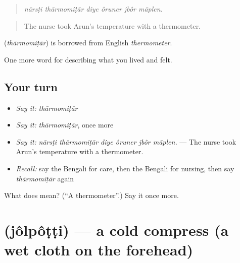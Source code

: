 \begin{quote}
     
\end{quote}

\begin{quote}
\emph{nārsṭi thārmomiṭār diye ôruner jbôr māplen.}
\end{quote}

\begin{quote}
The nurse took Arun's temperature with a thermometer.
\end{quote}

\begin{cousinweb}
\textbf{} (\emph{thārmomiṭār}) is borrowed from English \emph{thermometer}.
\end{cousinweb}

\begin{grammarlens}[title={What you've built}]
One more word for describing what you lived and felt.
\end{grammarlens}

\subsection*{Your turn}
\begin{itemize}
\raggedright
  \item \emph{Say it:} \emph{thārmomiṭār}
  \item \emph{Say it:} \emph{thārmomiṭār}, once more
  \item \emph{Say it:} \emph{nārsṭi thārmomiṭār diye ôruner jbôr māplen.} — The nurse took Arun's temperature with a thermometer.
  \item \emph{Recall:} say the Bengali for care, then the Bengali for nursing, then say \emph{thārmomiṭār} again
\end{itemize}

\begin{tcolorbox}[breakable,colback=teal!4,colframe=teal!35!black,title={Before you move on}]
What does  mean? (\textquotedblleft{}A thermometer\textquotedblright{}.) Say it once more.
\end{tcolorbox}
\section[\texorpdfstring{\bn{জলপট্টি} (jôlpôṭṭi)}{জলপট্টি (jôlpôṭṭi)}]{ (jôlpôṭṭi) — a cold compress (a wet cloth on the forehead)}

\label{lesson:BN-C478-jolpotti}



